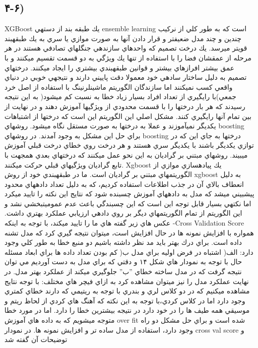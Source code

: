 \documentclass{article}
\begin{document}
\subsection{۴-۶) }
XGBoost يك طبقه بند از دستهي ensemble learning است كه به طور كلي از نركيب چندين و چند مدل ضعيفتر و قرار دادن آنها به صورت موازي يا سري به يك طبقهبند قويتر ميرسد. يك درخت تصميم كه واحدهاي سازندهي جنگلهاي تصادفي هستند در هر مرحله از عمقشان فضا را با استفاده از تنها يك ويژگي به دو قسمت تقسيم ميكنند و با عمق بيشتر افرازهاي بيشتر و قوانين طبقهبندي بيشتري را ايجاد ميكنند. درختهاي تصميم به دليل ساختار سادهي خود معمولا دقت پاييني دارند و نتيجهي خوبي در دنياي واقعي كسب نميكنند اما سازندگان الگوريتم ماشينلرنينگ با استفاده از اصل خرد جمعي)با رايگيري از تعداد افراد بسيار زياد خطا به نسبت كم ميشود( به اين نتيجه رسيدند كه هر بار درختها را با قسمت محدودي از ويژگيها آموزش دهند و در نهايت از بين تمام آنها رايگيري كنند. مشكل اصلي اين الگوريتم اين است كه درختها از اشتباهات يكديگر نميآموزند و عملا به درختها به صورت مستقل نگاه ميشود. روشهاي boosting براي حل اين مشكل به وجود آمدند. در روشهاي boosting درختها به جاي اين كه در توازي يكديگر باشند با يكديگر سري هستند و هر درخت روي خطاي درخت قبلي آموزش ميبيند. روشهاي مبتني بر گراديان به اين نحو عمل ميكنند كه درختهاي بعدي همجهت با تابع گراديان ويژگيهاي قبلي حركت ميكنند. Xgboost يك پيادهسازي موازي از الگوريتمهاي
مبتني بر گراديان است. ما در طبقهبندي خود از روش xgboost به دليل انعطاف بالاي آن در جذب اطلاعات استفاده
كرديم، كه به دليل تعداد دادههاي محدود پيشبيني ميشد كه مدل به دادههاي آموزش چسبنده شود كه نتايج اين نكته را تاييد ميكرد اما نكتهي بسيار قابل توجه اين است كه اين چسبندگي باعث عدم عموميتبخشي نشد و اين الگوريتم از تمام الگوريتمهاي ديگر بر روي دادهي ارزيابي عملكرد بهتري داشت. عكس هاي زير گفته هاي ما را تاييد ميكند، با توجه به اينكه -Cross Validation Score همواره با افزايش نمونه ها در حال افزايش است، ميتوان نتيجه گيري كرد كه مدل تشنه داده است. براي درك بهتر بايد مد نظر داشته باشيم دو منبع خطا به طور كلي وجود
دارد: الف( اشتباه در فرض اوليه براي مدل ب( كم بودن تعداد داده ها براي ابعاد مسئله حال با توجه به نمودار هاي شكل ۱۴ و دقتي كه براي مدل به دست آورديم مي توان نتيجه گرفت كه در مدل ساخته خطاي ”ب” جلوگيري ميكند از عملكرد بهتر مدل. در نهايت عملكرد مدل را نيز ميتوان مشاهده كرد به ازاي فيچر هاي مختلف:
با توجه نتايج مشاهده ميكنيم كه در دو كلاس لري و بندري با توجه به ريتيمي كه دارند خطاي كمتري وجود دارد اما در كلاس كردي،با توجه به اين نكته كه آهنگ هاي كردي از لحاظ ريتم و موسيقي همه طيف ها را در خود دارد در نتيجه بيشترين خطا را دارد. اما در مورد خطا متوجه ميشويم كه به داده هاي آموزش over fit شده است و براي حل مشكل دو راه وجود دارد، استفاده از مدل ساده تر و افزايش نمونه ها. در نمودار cross val score و توضيحات آن گفته شد
\end{document}
